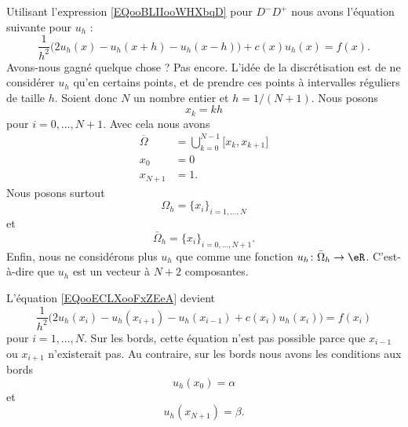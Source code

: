 	Utilisant l'expression \eqref{EQooBLIIooWHXbqD} pour \( D^-D^+\) nous avons l'équation suivante pour \( u_h\) :
	\begin{equation}        \label{EQooECLXooFxZEeA}
		\frac{1}{ h^2 }\Big( 2u_h(x)-u_h(x+h)-u_h(x-h) \Big)+c(x)u_h(x)=f(x).
	\end{equation}
	Avons-nous gagné quelque chose ? Pas encore. L'idée de la discrétisation est de ne considérer \( u_h\) qu'en certains points, et de prendre ces points à intervalles réguliers de taille \( h\). Soient donc \( N\) un nombre entier et \( h=1/(N+1)\). Nous posons
	\begin{equation}
		x_k=kh
	\end{equation}
	pour \( i=0,\ldots, N+1\). Avec cela nous avons
	\begin{subequations}
		\begin{align}
			\overline{ \Omega } & =\bigcup_{k=0}^{N-1}\mathopen[ x_k , x_{k+1} \mathclose] \\
			x_0                 & =0                                                       \\
			x_{N+1}             & =1.
		\end{align}
	\end{subequations}
	Nous posons surtout
	\begin{equation}
		\Omega_h=\{ x_i \}_{i=1,\ldots, N}
	\end{equation}
	et
	\begin{equation}
		\bar\Omega_h=\{ x_i \}_{i=0,\ldots, N+1}.
	\end{equation}
	Enfin, nous ne considérons plus \( u_h\) que comme une fonction \( u_h\colon \bar\Omega_h\to \eR\). C'est-à-dire que \( u_h\) est un vecteur à \( N+2\) composantes.

	L'équation \eqref{EQooECLXooFxZEeA} devient
	\begin{equation}        \label{EQooZMVMooTqlpkF}
		\frac{1}{ h^2 }\big( 2u_h(x_i)-u_h(x_{i+1})-u_h(x_{i-1})+c(x_i)u_h(x_i) \big)=f(x_i)
	\end{equation}
	pour \( i=1,\ldots, N\). Sur les bords, cette équation n'est pas possible parce que \( x_{i-1}\) ou \( x_{i+1}\) n'existerait pas. Au contraire, sur les bords nous avons les conditions aux bords
	\begin{equation}
		u_h(x_0)=\alpha
	\end{equation}
	et
	\begin{equation}
		u_h(x_{N+1})=\beta.
	\end{equation}

